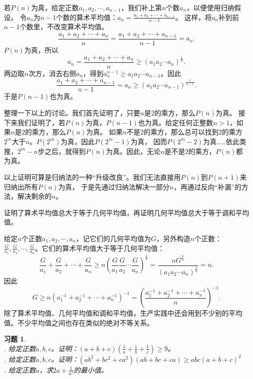 \documentclass[12pt,UTF8]{ctexbook}
\newtheorem{xt}{习题}[section]
\begin{document}
若$P(n)$为真，给定正数$a_1, a_2, \cdots , a_{n-1}$，我们补上第$n$个数$a_n$，以便使用归纳假设。
令$a_n$为$n-1$个数的算术平均值：$a_n = \frac{a_1 + a_2 + \cdots + a_{n-1}}{n-1}$。
这样，将$a_n$补到前$n-1$个数里，不改变算术平均值。
$$ \frac{a_1 + a_2 + \cdots + a_n}{n} = \frac{a_1 + a_2 + \cdots + a_{n-1}}{n-1} = a_n. $$
$P(n)$为真，所以
$$ a_n = \frac{a_1 + a_2 + \cdots + a_n}{n} \geqslant (a_1a_2\cdots a_{n})^{\frac{1}{n}}. $$
两边取$n$次方，消去右侧$a_n$，得到$a_n^{n-1} \geqslant a_1a_2\cdots a_{n-1}$。因此
$$   \frac{a_1 + a_2 + \cdots + a_{n-1}}{n-1} = a_n \geqslant (a_1a_2\cdots a_{n-1})^{\frac{1}{n-1}}. $$
于是$P(n-1)$也为真。

整理一下以上的讨论。我们首先证明了，只要$n$是$2$的乘方，那么$P(n)$为真。
接下来我们证明了，若$P(n)$为真，$P(n-1)$也为真。给定任何正整数$n>1$，如果$n$是$2$的乘方，那么$P(n)$为真。
如果$n$不是$2$的乘方，那么总可以找到$2$的乘方$2^m$大于$n$。$P(2^m)$为真，因此$P(2^m-1)$为真，
因而$P(2^m-2)$为真……依此类推，$2^m-n$步之后，就得到$P(n)$为真。因此，无论$n$是不是$2$的乘方，$P(n)$都为真。

以上证明可算是归纳法的一种“升级改良”。我们无法直接用$P(n)$到$P(n+1)$来归纳出所有$P(n)$为真，
于是先通过归纳法解决一部分$n$，再通过反向“补漏”的方法，解决剩余的$n$。

证明了算术平均值总大于等于几何平均值，再证明几何平均值总大于等于调和平均值。

给定$n$个正数$a_1, a_2, \cdots , a_n$，记它们的几何平均值为$G$，另外构造$n$个正数：
$\frac{G}{a_1}, \frac{G}{a_2}, \cdots , \frac{G}{a_n}$。它们的算术平均值大于等于几何平均值：
$$ \frac{G}{a_1} + \frac{G}{a_2} + \cdots + \frac{G}{a_n} \geqslant n\left(\frac{G}{a_1}\frac{G}{a_2}\cdots \frac{G}{a_n}\right)^{\frac{1}{n}} = \frac{nG^\frac{n}{n}}{(a_1a_2\cdots a_{n})^{\frac{1}{n}}} = n.$$
因此
$$ G \geqslant n \left(a_1^{-1} + a_2^{-1} + \cdots + a_n^{-1}\right)^{-1} =  \left(\frac{a_1^{-1} + a_2^{-1} + \cdots + a_n^{-1}}{n}\right)^{-1}. $$
除了算术平均值、几何平均值和调和平均值，生产实践中还会用到不少别的平均值。不少平均值之间也存在类似的绝对不等关系。

\begin{xt}    
    \mbox{}\\
    . 给定正数$a,b,c$。证明：$(a + b + c)(\frac{1}{a}+\frac{1}{b}+\frac{1}{c}) \geqslant 9$。\\
    . 给定正数$a,b,c$。证明：$(ab^2 + bc^2 + ca^2)(ab + bc + ca) \geqslant abc(a+b+c)^2$ \\
    . 给定正数$a$，求$2a + \frac{1}{a^2}$的最小值。
\end{xt}
\end{document}
